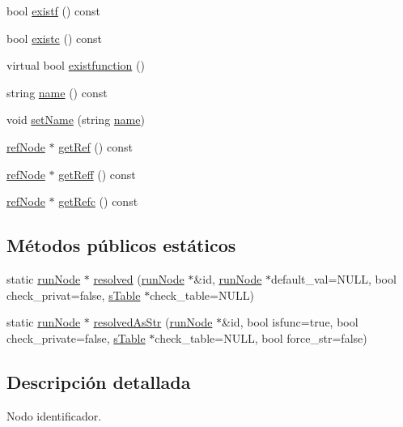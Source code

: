 \begin{DoxyCompactItemize}
\item 
bool \hyperlink{classidNode_acaa38cc6ad44035f2229b82d7609b941}{existf} () const 
\item 
bool \hyperlink{classidNode_afff9130fd75f482fdb9f1c3ab0cb98c5}{existc} () const 
\item 
virtual bool \hyperlink{classidNode_a70123074df6f875c8308a4f5854b033d}{existfunction} ()
\item 
string \hyperlink{classidNode_a6b2f2759674e4757d4ec8a5812fabd51}{name} () const 
\item 
void \hyperlink{classidNode_ad63a31b677af72e2ad7924b9a63fc4cd}{set\-Name} (string \hyperlink{classidNode_a6b2f2759674e4757d4ec8a5812fabd51}{name})
\item 
\hyperlink{classrefNode}{ref\-Node} $\ast$ \hyperlink{classidNode_a9a18e57d85c325a95aa2e490d5831622}{get\-Ref} () const 
\item 
\hyperlink{classrefNode}{ref\-Node} $\ast$ \hyperlink{classidNode_aa64b9b4361c1f1e6cbf0533ac09bd7eb}{get\-Reff} () const 
\item 
\hyperlink{classrefNode}{ref\-Node} $\ast$ \hyperlink{classidNode_a697af0deaf3fff0438df5c6356b64dd7}{get\-Refc} () const 
\end{DoxyCompactItemize}
\subsection*{Métodos públicos estáticos}
\begin{DoxyCompactItemize}
\item 
static \hyperlink{classrunNode}{run\-Node} $\ast$ \hyperlink{classidNode_a9737789aa39604d013608f4d7fb9e60a}{resolved} (\hyperlink{classrunNode}{run\-Node} $\ast$\&id, \hyperlink{classrunNode}{run\-Node} $\ast$default\-\_\-val=N\-U\-L\-L, bool check\-\_\-privat=false, \hyperlink{classsTable}{s\-Table} $\ast$check\-\_\-table=N\-U\-L\-L)
\item 
static \hyperlink{classrunNode}{run\-Node} $\ast$ \hyperlink{classidNode_a70be10ae0c1bc5d1f4e6c142baeef403}{resolved\-As\-Str} (\hyperlink{classrunNode}{run\-Node} $\ast$\&id, bool isfunc=true, bool check\-\_\-private=false, \hyperlink{classsTable}{s\-Table} $\ast$check\-\_\-table=N\-U\-L\-L, bool force\-\_\-str=false)
\end{DoxyCompactItemize}


\subsection{Descripción detallada}
Nodo identificador. 

